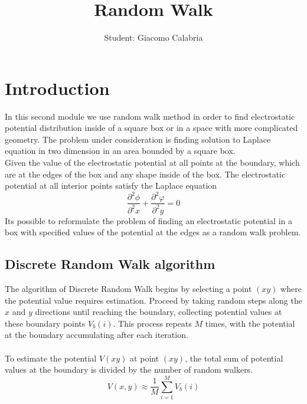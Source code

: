 \documentclass{article}
\title{\textbf{Random Walk}}
\author{Student: Giacomo Calabria}
\date{}
\begin{document}
\maketitle

\section*{Introduction}
In this second module we use random walk method in order to find electrostatic potential distribution inside of a square box or in a space with more complicated geometry. The problem under consideration is finding solution to Laplace equation in two dimension in an area bounded by a square box.\\
Given the value of the electrostatic potential at all points at the boundary, which are at the edges of the box and any shape inside of the box. The electrostatic potential at all interior points satisfy the Laplace equation
\begin{equation}
    \frac{\partial^2\phi}{\partial^2x}+\frac{\partial^2\varphi}{\partial^2y}=0
\end{equation}
Its possible to reformulate the problem of finding an electrostatic potential in a box with specified values of the potential at the edges as a random walk problem.
\subsection*{Discrete Random Walk algorithm}
The algorithm of Discrete Random Walk begins by selecting a point $(xy)$ where the potential value requires estimation. Proceed by taking random steps along the $x$ and $y$ directions until reaching the boundary, collecting potential values at these boundary points $V_b(i)$. This process repeats $M$ times, with the potential at the boundary accumulating after each iteration.\\\\To estimate the potential $V(xy)$ at point $(xy)$, the total sum of potential values at the boundary is divided by the number of random walkers.
\begin{equation}
    V(x,y)\approx\frac1M\sum_{i=1}^M{V_b(i)}
\end{equation}
\end{document}
